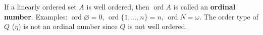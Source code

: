 If a linearly ordered set \(A\) is well ordered, then \(\operatorname{ord} A\) is called an \textbf{ordinal number}. Examples: \(\operatorname{ord} \varnothing = 0\), \(\operatorname{ord}\{1,\ldots,n\} = n\), \(\operatorname{ord} N = \omega\). The order type of \(Q\) (\(\eta\)) is not an ordinal number since \(Q\) is not well ordered.